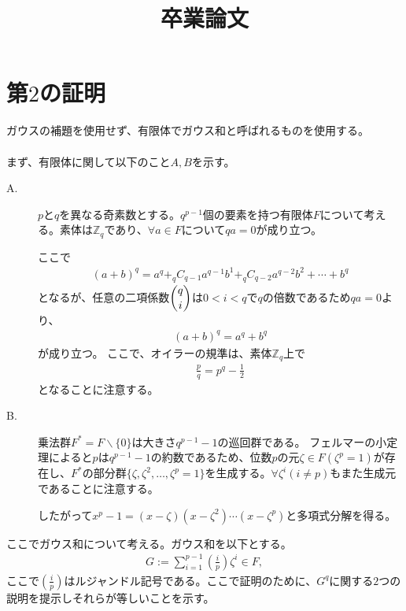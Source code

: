 \documentclass[12pt]{jarticle}
\title{卒業論文}
\begin{document}
\tableofcontents
\date{}
\maketitle
\section{第$2$の証明}
ガウスの補題を使用せず、有限体で$\boldsymbol{ガウス和}$と呼ばれるものを使用する。
\\
\\
まず、有限体に関して以下のこと$A, B$を示す。
\begin{description}
  \item[A.] $p$と$q$を異なる奇素数とする。$q^{p-1}$個の要素を持つ有限体$F$について考える。素体は$\mathbb{Z}_q$であり、$\forall a∈F$について$qa=0$が成り立つ。

  ここで
  \begin{align*}
    \label{}
    \displaystyle
    (a+b)^q=a^q+ _q C _{q - 1} a^{q -1 } b^{1} + _q C _{q - 2} a^{q -2 } b^{2} + \cdots +b^q
  \end{align*}
  となるが、任意の二項係数$\dbinom{q}{i}$は$0<i<q$で$q$の倍数であるため$qa=0$より、
  \begin{align}
    \label{00}
    \displaystyle
    (a+b)^q=a^q+ b^q
  \end{align}
  が成り立つ。
  ここで、オイラーの規準は、素体$\mathbb{Z}_q$上で
  \begin{align*}
    \displaystyle
    \frac{p}{q} = p^q - \frac{1}{2}
  \end{align*}
  となることに注意する。
  \item[B.]乗法群$F^{\ast}=F\backslash \{0\}$は大きさ$q^{p-1} -1$の巡回群である。
  フェルマーの小定理によると$p$は$q^{p-1} -1$の約数であるため、位数$p$の元$\zeta \in F(\zeta^ p = 1)$が存在し、$F^{\ast}$の部分群$\displaystyle \{\zeta,\zeta^2, \ldots, \zeta^p =1\}$を生成する。$\displaystyle \forall \zeta^i(i\neq p)$もまた生成元であることに注意する。

  したがって$x^p -1=(x-\zeta)(x-\zeta^2)\cdots(x-\zeta^p)$と多項式分解を得る。
\end{description}
ここでガウス和について考える。ガウス和を以下とする。
\begin{align}
  \label{01}
  \displaystyle
  G :=\sum_{i=1}^{p-1} (\frac{i}{p}) \zeta^i \in F,
\end{align}
ここで$\displaystyle  (\frac{i}{p})$はルジャンドル記号である。ここで証明のために、$G^q$に関する$2$つの説明を提示しそれらが等しいことを示す。\\
\end{document}
